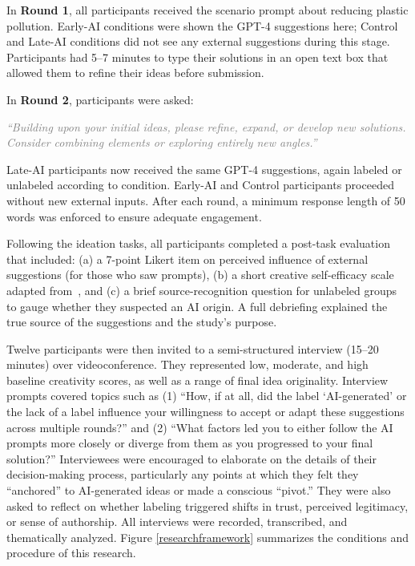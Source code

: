 \documentclass{article}
\begin{document}
In \textbf{Round 1}, all participants received the scenario prompt about reducing plastic pollution. Early-AI conditions were shown the GPT-4 suggestions here; Control and Late-AI conditions did not see any external suggestions during this stage. Participants had 5–7 minutes to type their solutions in an open text box that allowed them to refine their ideas before submission. 

In \textbf{Round 2}, participants were asked:

\textit{\textcolor{gray}{``Building upon your initial ideas, please refine, expand, or develop new solutions. Consider combining elements or exploring entirely new angles.”}}

Late-AI participants now received the same GPT-4 suggestions, again labeled or unlabeled according to condition. Early-AI and Control participants proceeded without new external inputs. After each round, a minimum response length of 50 words was enforced to ensure adequate engagement.

Following the ideation tasks, all participants completed a post-task evaluation that included: (a) a 7-point Likert item on perceived influence of external suggestions (for those who saw prompts), (b) a short creative self-efficacy scale adapted from~\cite{shaw2021measuring}, and (c) a brief source-recognition question for unlabeled groups to gauge whether they suspected an AI origin. A full debriefing explained the true source of the suggestions and the study’s purpose.

Twelve participants were then invited to a semi-structured interview (15–20 minutes) over videoconference. They represented low, moderate, and high baseline creativity scores, as well as a range of final idea originality. Interview prompts covered topics such as (1) “How, if at all, did the label ‘AI-generated’ or the lack of a label influence your willingness to accept or adapt these suggestions across multiple rounds?” and (2) “What factors led you to either follow the AI prompts more closely or diverge from them as you progressed to your final solution?” Interviewees were encouraged to elaborate on the details of their decision-making process, particularly any points at which they felt they “anchored” to AI-generated ideas or made a conscious “pivot.” They were also asked to reflect on whether labeling triggered shifts in trust, perceived legitimacy, or sense of authorship. All interviews were recorded, transcribed, and thematically analyzed. Figure \ref{researchframework} summarizes the conditions and procedure of this research.
\end{document}
